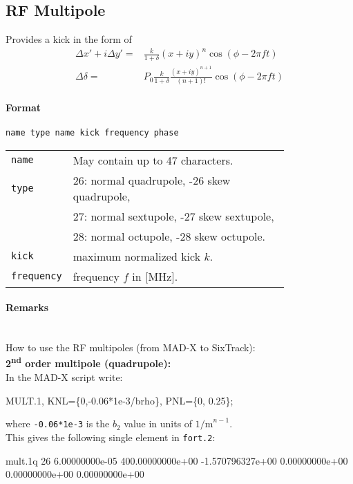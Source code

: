 \subsection{RF Multipole}

Provides a kick in the form of
\begin{align}
    \Delta x'+i\Delta y' =& \frac{k}{1+\delta} (x+iy)^n \cos (\phi - 2 \pi f t) \\
    \Delta \delta =& P_0 \frac{k}{1+\delta} \frac{(x+iy)^{n+1}}{(n+1)!} \cos (\phi - 2 \pi f t)
\end{align}

\paragraph{Format} \texttt{name type name kick frequency phase}

\bigskip
\begin{tabular}{@{}lp{0.8\linewidth}}
    \texttt{name} & May contain up to 47 characters. \\
    \texttt{type} & 26: normal quadrupole, -26 skew quadrupole, \\
                  & 27: normal sextupole, -27 skew sextupole, \\
                  & 28: normal octupole, -28 skew octupole. \\
    \texttt{kick} & maximum normalized kick $k$. \\
    \texttt{frequency} & frequency $f$ in [MHz].
\end{tabular}

\paragraph{Remarks}~\\
How to use the RF multipoles (from MAD-X to SixTrack):\\

\noindent\textbf{2\textsuperscript{nd} order multipole (quadrupole):}\\
\noindent In the MAD-X script write:
\begin{ctverbatim}
MULT.1, KNL=\{0,-0.06*1e-3/brho\}, PNL=\{0, 0.25\};
\end{ctverbatim}
where \texttt{-0.06*1e-3} is the $b_2$ value in units of $\mathrm{1/m}^{n-1}$.\\
This gives the following single element in \texttt{fort.2}:
\begin{ctverbatim}
mult.1q  26  6.00000000e-05  400.00000000e+00  -1.570796327e+00  0.00000000e+00  0.00000000e+00  0.00000000e+00
\end{ctverbatim}

